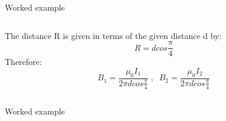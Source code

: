 {\begin{frame}{Worked example}
\begin{columns}
\begin{column}{0.68\textwidth}
{          The distance R is given in terms of the given distance d by:
          \begin{equation*}
               R = d cos\frac{\pi}{4}
          \end{equation*}
          Therefore:
          \begin{equation*}
             B_1 = \frac{\mu_0I_1}{2\pi d cos\frac{\pi}{4}} \;,\;\;
             B_2 = \frac{\mu_0I_2}{2\pi d cos\frac{\pi}{4}}
         \end{equation*}
    }
  \end{column}
\end{columns}

\end{frame}


%
%
%

\begin{frame}{Worked example}


\end{frame}}
